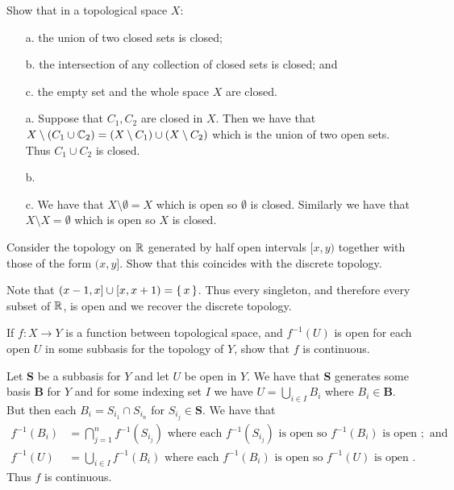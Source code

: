 \documentclass[letterpaper, 11pt]{article}
\begin{document}
\begin{exercise}
  Show that in a topological space $X$:
  \begin{enumerate}
  \item[a.] the union of two closed sets is closed;
  \item[b.] the intersection of any collection of closed sets is closed; and
  \item[c.] the empty set and the whole space $X$ are closed.
  \end{enumerate}
\end{exercise}
\begin{pf}
  \begin{enumerate}
  \item[a.] Suppose that $C_{1}, C_{2}$ are closed in $X$.
        Then we have that $X \setminus (C_{1} \cup \mathbb{C}_{2}) = (X \setminus C_{1}) \cup (X \setminus C_{2})$ which is the union of two open sets.
        Thus $C_{1} \cup C_{2}$ is closed.
  \item[b.] 
  \item[c.] We have that $X \setminus \emptyset = X$ which is open so $\emptyset$ is closed.
        Similarly we have that $X \setminus X = \emptyset$ which is open so $X$ is closed.
  \end{enumerate}
\end{pf}

\begin{exercise}
  Consider the topology on $\mathbb{R}$ generated by half open intervals $[x, y)$ together with those of the form $(x, y]$.
  Show that this coincides with the discrete topology.
\end{exercise}
\begin{pf}
  Note that $(x - 1, x] \cup [x, x + 1) = \set{x}$.
  Thus every singleton, and therefore every subset of $\mathbb{R}$, is open and we recover the discrete topology.
\end{pf}

\begin{exercise}
  If $f\colon X \to Y$ is a function between topological space, and $f^{-1}(U)$ is open for each open $U$ in some subbasis for the topology of $Y$, show that $f$ is continuous.
\end{exercise}
\begin{pf}
  Let \textbf{S} be a subbasis for $Y$ and let $U$ be open in $Y$.
  We have that \textbf{S} generates some basis \textbf{B} for $Y$ and for some indexing set $I$ we have $U = \bigcup_{i \in I} B_{i}$ where $B_{i} \in \textbf{B}$.
  But then each $B_{i} = S_{i_{1}} \cap S_{i_{n}}$ for $S_{i_{j}} \in \textbf{S}$.
  We have that
  \begin{align*}
    f^{-1}(B_{i}) &= \bigcap_{j = 1}^{n} f^{-1}(S_{i_{j}}) \text{ where each } f^{-1}(S_{i_{j}}) \text{ is open so } f^{-1}(B_{i}) \text{ is open }; \text{ and} \\
    f^{-1}(U) &= \bigcup_{i \in I} f^{-1}(B_{i}) \text{ where each } f^{-1}(B_{i}) \text{ is open so } f^{-1}(U) \text{ is open }.
  \end{align*}
  Thus $f$ is continuous.
\end{pf}
\end{document}
